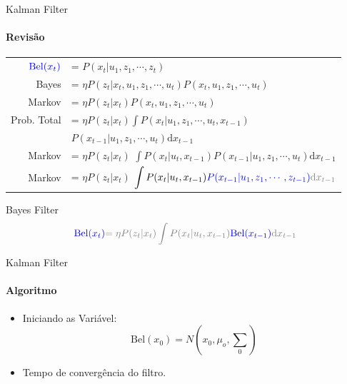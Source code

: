 \documentclass[aspectratio=169]{beamer}
\begin{document}
\begin{frame}{Kalman Filter}
    \framesubtitle{Revisão}
    \setlength\extrarowheight{5pt}
        \begin{tabular}{r l}
            $\color{blue}{\text{Bel}}(x_t)$ & = $P(x_t| u_1, z_1,  \cdots, z_t)$ \\
            Bayes & = $\eta P(z_t|x_t,  u_1, z_1,  \cdots,  u_t)P(x_t, u_1, z_1, \cdots, u_t)$ \\
            Markov & = $\eta P(z_t|x_t)P(x_t, u_1, z_1, \cdots, u_t)$ \\
            Prob. Total & = $\eta P(z_t|x_t)\displaystyle\int P(x_t| u_1, z_1, \cdots, u_t,x_{t-1})$ \\
                        &  \quad \quad \quad $P(x_{t-1}| u_1, z_1, \cdots, u_t)\text{d}x_{t-1}$\\
            Markov & = $\eta P(z_t|x_t)$ $\displaystyle\int P(x_t| u_t,x_{t-1})P(x_{t-1}| u_1, z_1, \cdots, u_t)\text{d}x_{t-1}$ \\
            Markov & = $\eta P(z_t|x_t)$ $\displaystyle\int P(x_t| u_t,x_{t-1})\color{blue}{P(x_{t-1}| u_1, z_1, \cdots, z_{t-1}})\color{gray}{\text{d}x_{t-1}}$ \\
        \end{tabular}   
    \begin{block}{Bayes Filter}
        \begin{equation*}
            \color{blue}{\text{Bel}}(x_t)  \color{gray}{=\eta P(z_t|x_t)\displaystyle\int P(x_t| u_t,x_{t-1})}\textcolor{blue}{\text{Bel}(x_{t-1})}\text{d}x_{t-1}
        \end{equation*}
    \end{block}
\end{frame}


\begin{frame}[c]{Kalman Filter}
    \framesubtitle{Algoritmo}
    \begin{itemize}
        \item Iniciando as Variável:
        \begin{equation}
            \text{Bel}(x_0) = N\left(x_0, \mu_o, {\textstyle\sum} _0\right)
        \end{equation}
        \item Tempo de convergência do filtro.
    \end{itemize}
\end{frame}
\end{document}
